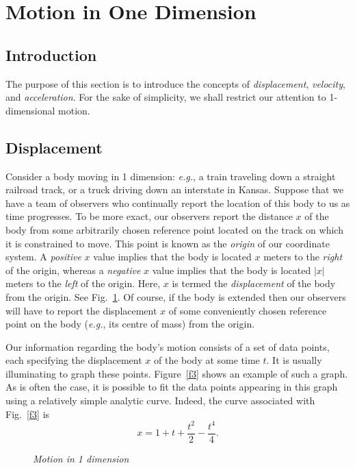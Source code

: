 \section{Motion in One Dimension}
\subsection{Introduction}
The purpose of this section is to introduce the concepts of {\em displacement},
{\em velocity}, and {\em acceleration}. For the sake of simplicity, we shall
restrict our attention to 1-dimensional motion.

\subsection{Displacement}
Consider a body moving in 1 dimension: {\em e.g.}, a train traveling down a straight
railroad track, or a truck driving down an interstate in Kansas. Suppose that we have
a team of observers who continually report the location of this body to us as time
progresses. To be more exact, our observers report the distance $x$ of the body
  from
some arbitrarily chosen reference point located on the track on which it is constrained to move. This
point is known as the {\em origin} of our coordinate system. A {\em positive} $x$ value implies
that the body is located $x$ meters to the {\em right} of the origin, whereas a {\em negative}
$x$ value implies that the body is located $|x|$ meters to the {\em left} of the origin.
Here, $x$ is termed the {\em displacement} of the body from the origin. See Fig.~\ref{f2}.
Of course, if the body is extended then our observers will have to report the displacement
$x$ of some conveniently chosen reference point on the body ({\em e.g.}, its centre
of mass) from the origin.

Our information regarding the body's motion  consists of a set of data points,
each specifying the displacement $x$ of the body at some time $t$. It is
usually illuminating to graph these points. Figure~\ref{f3} shows an example of such a graph. 
As is often the case, it is possible to fit the data points appearing in this
graph using a relatively
simple analytic curve. Indeed, the curve associated with Fig.~\ref{f3} is
\begin{equation}\label{e21}
x = 1 + t + \frac{t^2}{2} - \frac{t^4}{4}.
\end{equation}

\begin{figure}[b]
\epsfysize=1in
\centerline{}
\caption{\em Motion in 1 dimension}\label{f2}   
\end{figure}

